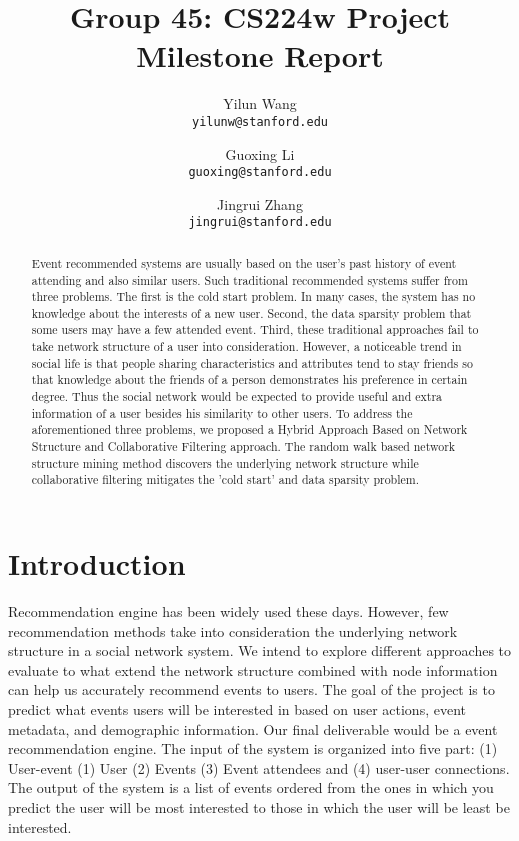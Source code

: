 \documentclass{article}
\begin{document}
\title{Group 45: CS224w Project Milestone Report}
\author{Yilun Wang\\
\texttt{yilunw@stanford.edu}
 \and Guoxing Li\\
\texttt{guoxing@stanford.edu}
 \and Jingrui Zhang\\
 \texttt{jingrui@stanford.edu}}
\maketitle


\begin{abstract}

Event recommended systems are usually based on the user’s past history of event attending and also similar users. Such traditional recommended systems suffer from three problems. The first is the cold start problem. In many cases, the system has no knowledge about the interests of a new user. Second, the data sparsity problem that some users may have a few attended event. Third, these traditional approaches fail to take network structure of a user into consideration. However, a noticeable trend in social life is that people sharing characteristics and attributes tend to stay friends so that knowledge about the friends of a person demonstrates his preference in certain degree. Thus the social network would be expected to provide useful and extra information of a user besides his similarity to other users. To address the aforementioned three problems, we proposed a Hybrid Approach Based on Network Structure and Collaborative Filtering approach. The random walk based network structure mining method discovers the underlying network structure while collaborative filtering mitigates the 'cold start' and data sparsity problem. 

\end{abstract}


\section{Introduction}
Recommendation engine has been widely used these days. However, few recommendation methods take into consideration the underlying network structure in a social network system. We intend to explore different approaches to evaluate to what extend the network structure combined with node information can help us accurately recommend events to users.
The goal of the project is to predict what events users will be interested in based on user actions, event metadata, and demographic information. Our final deliverable would be a event recommendation engine. The input of the system is organized into five part: (1) User-event (1) User (2) Events (3) Event attendees and (4) user-user connections. The output of the system is a list of events ordered from the ones in which you predict the user will be most interested to those in which the user will be least be interested.
\end{document}
